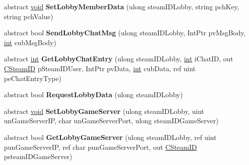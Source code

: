 \begin{DoxyCompactItemize}
\item 
\hypertarget{classValve_1_1Steamworks_1_1ISteamMatchmaking_aeff40f91b8c1960e5011e6452c4c53f5}{}abstract \hyperlink{SDL__audio_8h_a52835ae37c4bb905b903cbaf5d04b05f}{void} {\bfseries Set\+Lobby\+Member\+Data} (ulong steam\+I\+D\+Lobby, string pch\+Key, string pch\+Value)\label{classValve_1_1Steamworks_1_1ISteamMatchmaking_aeff40f91b8c1960e5011e6452c4c53f5}

\item 
\hypertarget{classValve_1_1Steamworks_1_1ISteamMatchmaking_a8ebd7b15662e681dd52b19f108d72759}{}abstract bool {\bfseries Send\+Lobby\+Chat\+Msg} (ulong steam\+I\+D\+Lobby, Int\+Ptr pv\+Msg\+Body, \hyperlink{SDL__thread_8h_a6a64f9be4433e4de6e2f2f548cf3c08e}{int} cub\+Msg\+Body)\label{classValve_1_1Steamworks_1_1ISteamMatchmaking_a8ebd7b15662e681dd52b19f108d72759}

\item 
\hypertarget{classValve_1_1Steamworks_1_1ISteamMatchmaking_aa218bd1f15e69745ece416dd3d4ea564}{}abstract \hyperlink{SDL__thread_8h_a6a64f9be4433e4de6e2f2f548cf3c08e}{int} {\bfseries Get\+Lobby\+Chat\+Entry} (ulong steam\+I\+D\+Lobby, \hyperlink{SDL__thread_8h_a6a64f9be4433e4de6e2f2f548cf3c08e}{int} i\+Chat\+I\+D, out \hyperlink{structValve_1_1Steamworks_1_1CSteamID}{C\+Steam\+I\+D} p\+Steam\+I\+D\+User, Int\+Ptr pv\+Data, \hyperlink{SDL__thread_8h_a6a64f9be4433e4de6e2f2f548cf3c08e}{int} cub\+Data, ref uint pe\+Chat\+Entry\+Type)\label{classValve_1_1Steamworks_1_1ISteamMatchmaking_aa218bd1f15e69745ece416dd3d4ea564}

\item 
\hypertarget{classValve_1_1Steamworks_1_1ISteamMatchmaking_aa288e2ee744dcecb1571f7a1ca30151e}{}abstract bool {\bfseries Request\+Lobby\+Data} (ulong steam\+I\+D\+Lobby)\label{classValve_1_1Steamworks_1_1ISteamMatchmaking_aa288e2ee744dcecb1571f7a1ca30151e}

\item 
\hypertarget{classValve_1_1Steamworks_1_1ISteamMatchmaking_a1df874959a5adf99a569c4928830de87}{}abstract \hyperlink{SDL__audio_8h_a52835ae37c4bb905b903cbaf5d04b05f}{void} {\bfseries Set\+Lobby\+Game\+Server} (ulong steam\+I\+D\+Lobby, uint un\+Game\+Server\+I\+P, char un\+Game\+Server\+Port, ulong steam\+I\+D\+Game\+Server)\label{classValve_1_1Steamworks_1_1ISteamMatchmaking_a1df874959a5adf99a569c4928830de87}

\item 
\hypertarget{classValve_1_1Steamworks_1_1ISteamMatchmaking_a8884bd6aed07bd995f11837b9f6f63dd}{}abstract bool {\bfseries Get\+Lobby\+Game\+Server} (ulong steam\+I\+D\+Lobby, ref uint pun\+Game\+Server\+I\+P, ref char pun\+Game\+Server\+Port, out \hyperlink{structValve_1_1Steamworks_1_1CSteamID}{C\+Steam\+I\+D} psteam\+I\+D\+Game\+Server)\label{classValve_1_1Steamworks_1_1ISteamMatchmaking_a8884bd6aed07bd995f11837b9f6f63dd}


\end{DoxyCompactItemize}
